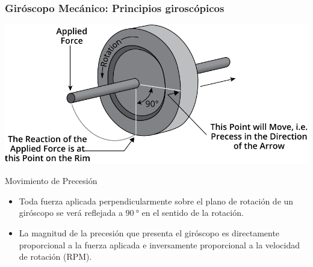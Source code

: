 \begin{frame}
    \frametitle{Giróscopo Mecánico: Principios giroscópicos}
    \scriptsize
    
    \begin{center}
        \hspace{1em}
        \includegraphics[width=0.4\columnwidth,valign=m]{images/gyroscope_precession.pdf}
    \end{center}
    \begin{block}{Movimiento de Precesión}
            \begin{itemize}
                \item Toda fuerza aplicada perpendicularmente sobre el plano de rotación de un giróscopo se verá reflejada a $\SI{90}{\degree}$ en el sentido de la rotación.
                \item La magnitud de la precesión que presenta el giróscopo es directamente proporcional a la fuerza aplicada e inversamente proporcional a la velocidad de rotación (RPM).
            \end{itemize}
    \end{block}
    
\end{frame}



